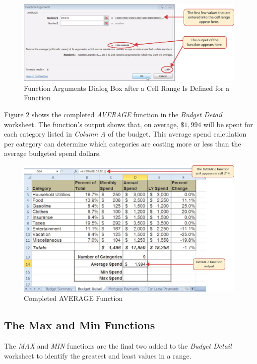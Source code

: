 \begin{figure}[H]
	\centering
	\includegraphics[width=\maxwidth{.95\linewidth}]{gfx/ch02_fig22}
	\caption{Function Arguments Dialog Box after a Cell Range Is Defined for a Function}
	\label{02:fig22}
\end{figure}

Figure \ref{02:fig23} shows the completed \textit{AVERAGE} function in the \textit{Budget Detail} worksheet. The function's output shows that, on average, $ \$1,994 $ will be spent for each category listed in \textit{Column A} of the budget. This average spend calculation per category can determine which categories are costing more or less than the average budgeted spend dollars.

\begin{figure}[H]
	\centering
	\includegraphics[width=\maxwidth{.95\linewidth}]{gfx/ch02_fig23}
	\caption{Completed AVERAGE Function}
	\label{02:fig23}
\end{figure}

\subsection{The Max and Min Functions}

The \textit{MAX} and \textit{MIN} functions are the final two added to the \textit{Budget Detail} worksheet to identify the greatest and least values in a range.

